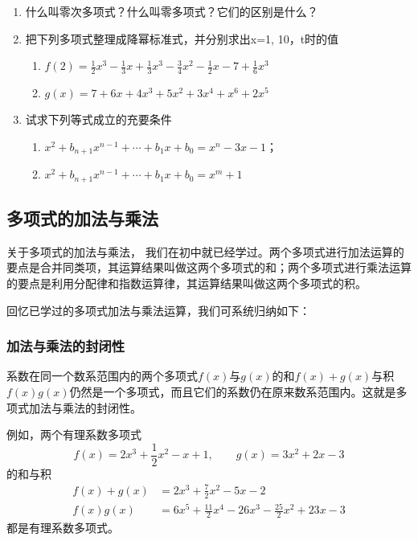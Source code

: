 \begin{ex}
\begin{enumerate}
    \item 
    什么叫零次多项式？什么叫零多项式？它们的区别是什么？
    \item 把下列多项式整理成降幂标准式，并分别求出x=1, 10，t时的值
    \begin{enumerate}
        \item $f (2) =\frac{1}{2}x^3-\frac{1}{3}x+\frac{1}{3}x^3-\frac{3}{4}x^2-\frac{1}{2}x-7+\frac{1}{6}x^3$
        \item $g(x)=7+6x+4x^3+5x^2+3x^4+x^6+2x^5$
    \end{enumerate}  
    \item 试求下列等式成立的充要条件
    \begin{enumerate}
        \item $x^2+b_{n+1}x^{n-1}+\cdots+b_1x+b_0=x^n-3x-1$；
        \item $x^2+b_{n+1}x^{n-1}+\cdots+b_1x+b_0=x^m+1$
    \end{enumerate}
\end{enumerate}
\end{ex}

\subsection{多项式的加法与乘法}

关于多项式的加法与乘法，
我们在初中就已经学过。两个多项式进行加法运算的要点是合并同类项，其运算结果叫做这两个多项式的和；两个多项式进行乘法运算的要点是利用分配律和指数运算律，其运算结果叫做这两个多项式的积。

回忆已学过的多项式加法与乘法运算，我们可系统归纳如下：

\subsubsection{加法与乘法的封闭性}

系数在同一个数系范围内的两个多项式$f(x)$与$g(x)$的和$f(x)+g(x)$与积$f(x)g(x)$仍然是一个多项式，而且它们的系数仍在原来数系范围内。这就是多项式加法与乘法的封闭性。

例如，两个有理系数多项式
\[f(x)=2x^3+\frac{1}{2}x^2-x+1,\qquad g(x)=3x^2+2x-3\]
的和与积
\[\begin{split}
    f(x)+g(x)&=2x^3+\frac{7}{2}x^2-5x-2\\
    f(x)g(x)&=6x^5+\frac{11}{2}x^4-26x^3-\frac{25}{2}x^2+23x-3
\end{split}\]
都是有理系数多项式。


